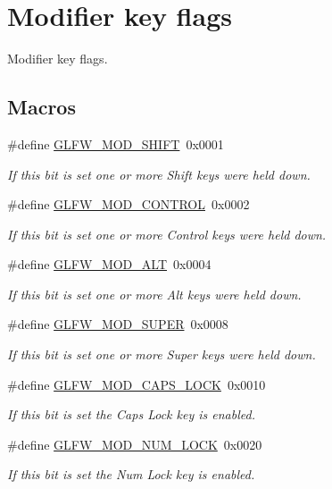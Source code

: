 \hypertarget{group__mods}{}\section{Modifier key flags}
\label{group__mods}


Modifier key flags.  


\subsection*{Macros}
\begin{DoxyCompactItemize}
\item 
\#define \mbox{\hyperlink{group__mods_ga14994d3196c290aaa347248e51740274}{G\+L\+F\+W\+\_\+\+M\+O\+D\+\_\+\+S\+H\+I\+FT}}~0x0001
\begin{DoxyCompactList}\small\item\em If this bit is set one or more Shift keys were held down. \end{DoxyCompactList}\item 
\#define \mbox{\hyperlink{group__mods_ga6ed94871c3208eefd85713fa929d45aa}{G\+L\+F\+W\+\_\+\+M\+O\+D\+\_\+\+C\+O\+N\+T\+R\+OL}}~0x0002
\begin{DoxyCompactList}\small\item\em If this bit is set one or more Control keys were held down. \end{DoxyCompactList}\item 
\#define \mbox{\hyperlink{group__mods_gad2acd5633463c29e07008687ea73c0f4}{G\+L\+F\+W\+\_\+\+M\+O\+D\+\_\+\+A\+LT}}~0x0004
\begin{DoxyCompactList}\small\item\em If this bit is set one or more Alt keys were held down. \end{DoxyCompactList}\item 
\#define \mbox{\hyperlink{group__mods_ga6b64ba10ea0227cf6f42efd0a220aba1}{G\+L\+F\+W\+\_\+\+M\+O\+D\+\_\+\+S\+U\+P\+ER}}~0x0008
\begin{DoxyCompactList}\small\item\em If this bit is set one or more Super keys were held down. \end{DoxyCompactList}\item 
\#define \mbox{\hyperlink{group__mods_gaefeef8fcf825a6e43e241b337897200f}{G\+L\+F\+W\+\_\+\+M\+O\+D\+\_\+\+C\+A\+P\+S\+\_\+\+L\+O\+CK}}~0x0010
\begin{DoxyCompactList}\small\item\em If this bit is set the Caps Lock key is enabled. \end{DoxyCompactList}\item 
\#define \mbox{\hyperlink{group__mods_ga64e020b8a42af8376e944baf61feecbe}{G\+L\+F\+W\+\_\+\+M\+O\+D\+\_\+\+N\+U\+M\+\_\+\+L\+O\+CK}}~0x0020
\begin{DoxyCompactList}\small\item\em If this bit is set the Num Lock key is enabled. \end{DoxyCompactList}\end{DoxyCompactItemize}


